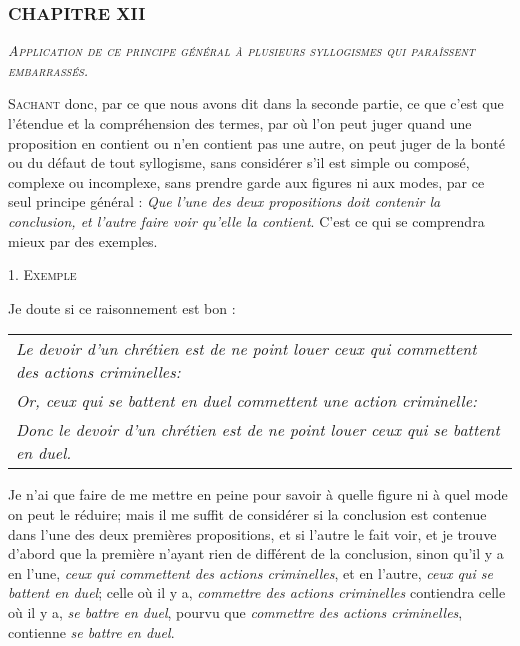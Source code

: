 \subsubsection{\centering \Large CHAPITRE XII}
\begin{center}\emph{\large\scshape Application de ce principe général à plusieurs syllogismes qui paraîssent embarrassés.}\end{center}

	\lettrine{S}{achant} donc, par ce que nous avons dit dans la seconde partie, ce que c'est que l'étendue et la compréhension des termes, par où l'on peut juger quand une proposition en contient ou n'en contient pas une autre, on peut juger de la bonté ou du défaut de tout syllogisme, sans considérer s'il est simple ou composé, complexe ou incomplexe, sans prendre garde aux figures ni aux modes, par ce seul principe général : \emph{Que l'une des deux propositions doit contenir la conclusion, et l'autre faire voir qu'elle la contient}. C'est ce qui se comprendra mieux par des exemples.

\begin{center}{\scshape 1. Exemple}\end{center}

Je doute si ce raisonnement est bon :

	\begin{tabularx}{\textwidth}{X}
		\emph{Le devoir d'un chrétien est de ne point louer ceux qui commettent des actions criminelles:} \\
		\emph{Or, ceux qui se battent en duel commettent une action criminelle:} \\
		\emph{Donc le devoir d'un chrétien est de ne point louer ceux qui se battent en duel.} \\
	\end{tabularx}

Je n'ai que faire de me mettre en peine pour savoir à quelle figure ni à quel mode on peut le réduire; mais il me suffit de considérer si la conclusion est contenue dans l'une des deux premières propositions, et si l'autre le fait voir, et je trouve d'abord que la première n'ayant rien de différent de la conclusion, sinon qu'il y a en l'une, \emph{ceux qui commettent des actions criminelles}, et en l'autre, \emph{ceux qui se battent en duel}; celle où il y a, \emph{commettre des actions criminelles} contiendra celle où il y a, \emph{se battre en duel}, pourvu que \emph{commettre des actions criminelles}, contienne \emph{se battre en duel}.

